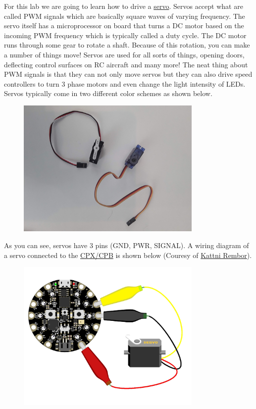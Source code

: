 For this lab we are going to learn how to drive a \href{https://www.adafruit.com/product/1143}{servo}. Servos accept what are called PWM signals which are basically square waves of varying frequency. The servo itself has a microprocessor on board that turns a DC motor based on the incoming PWM frequency which is typically called a duty cycle. The DC motor runs through some gear to rotate a shaft. Because of this rotation, you can make a number of things move! Servos are used for all sorts of things, opening doors, deflecting control surfaces on RC aircraft and many more! The neat thing about PWM signals is that they can not only move servos but they can also drive speed controllers to turn 3 phase motors and even change the light intensity of LEDs. Servos typically come in two different color schemes as shown below.
\begin{figure}[H]
  \begin{center}
    \includegraphics[width=0.8\textwidth]{Figures/servo.jpeg}
  \end{center}
\end{figure}
As you can see, servos have 3 pins (GND, PWR, SIGNAL). A wiring diagram of a servo connected to the \href{https://learn.adafruit.com/adafruit-circuit-playground-express/circuitpython-servo}{CPX/CPB} is shown below (Couresy of \href{https://learn.adafruit.com/u/kattni}{Kattni Rembor}). 
\begin{figure}[H]
  \begin{center}
    \includegraphics[width=0.8\textwidth]{Figures/circuitpython_CPXServo_bb.jpg}
  \end{center}
\end{figure}
